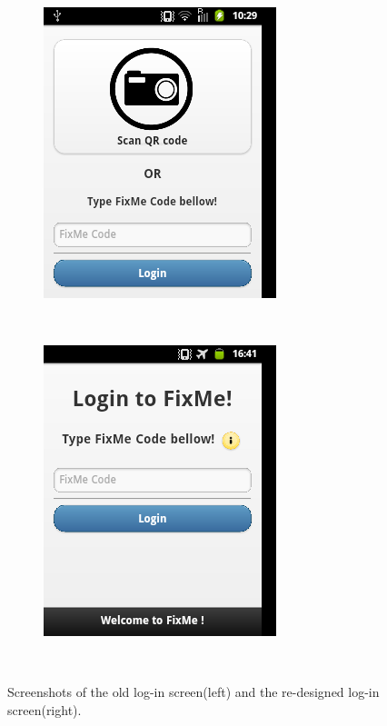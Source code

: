 \documentclass[12pt]{ecsproject}     %
\begin{document}
\begin{figure}
\centering
	\begin{subfigure}
	\centering	
	\includegraphics[scale=0.7]{login-old.png}
	\end{subfigure}
	~
	\begin{subfigure}
	\centering	
	\includegraphics[scale=0.7]{l1.png}
	\end{subfigure}
	~	
	\caption{Screenshots of the old log-in screen(left) and the re-designed log-in screen(right).}	
\label{fig:login}
\end{figure}
\end{document}
